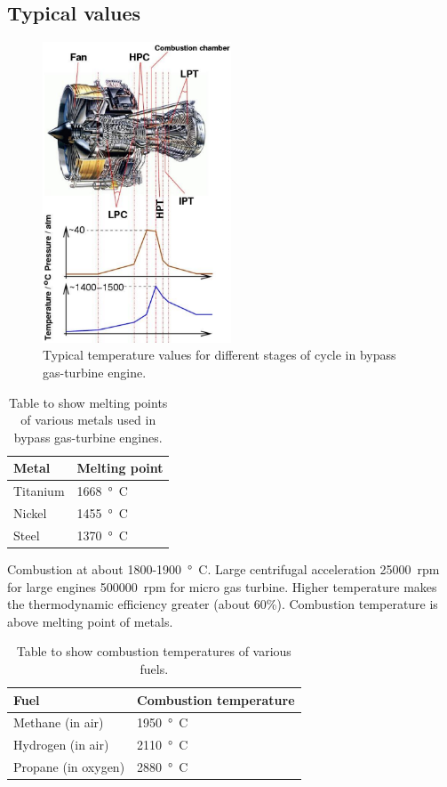 \subsection{Typical values}
\begin{figure}[H]
    \centering
    \includegraphics[width =0.5\textwidth]{img/figure21.png}
    \caption{Typical temperature values for different stages of cycle in bypass gas-turbine engine.}
\end{figure}
\begin{table}[H]
    \centering
    \begin{tabular}{@{}ll@{}}
        \toprule
        \textbf{Metal} & \textbf{Melting point}\\
        \midrule
        Titanium & \SI{1668}{\degree C}\\
        Nickel & \SI{1455}{\degree C}\\
        Steel & \SI{1370}{\degree C}\\
        \bottomrule
    \end{tabular}
    \caption{Table to show melting points of various metals used in bypass gas-turbine engines.}
\end{table}
Combustion at about 1800-\SI{1900}{\degree C}. Large centrifugal acceleration \SI{25000}{rpm} for large engines \SI{500000}{rpm} for micro gas turbine. Higher temperature makes the thermodynamic efficiency greater (about 60\%). Combustion temperature is above melting point of metals. 
\begin{table}[H]
    \centering
    \begin{tabular}{@{}ll@{}}
        \toprule
        \textbf{Fuel} & \textbf{Combustion temperature}\\
        \midrule
        Methane (in air) & \SI{1950}{\degree C}\\
        Hydrogen (in air) & \SI{2110}{\degree C}\\
        Propane (in oxygen) & \SI{2880}{\degree C}\\
        \bottomrule
    \end{tabular}
    \caption{Table to show combustion temperatures of various fuels.}
\end{table}
